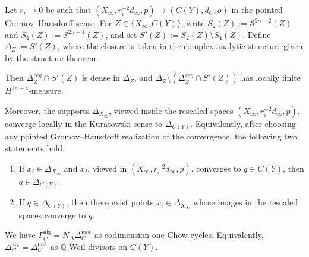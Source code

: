 \documentclass[10pt,a4paper]{amsart}
\begin{document}
\begin{lemma}
\label{lem:boundary-support-convergence}
Let $r_i\to0$ be such that
$(X_\infty,r_i^{-2}d_\infty,p)\to (C(Y),d_C,o)$ in the pointed
Gromov--Hausdorff sense. For $Z\in\{X_\infty,C(Y)\}$, write
$S_2(Z):=\mathcal S^{2n-2}(Z)$ and $S_4(Z):=\mathcal S^{2n-4}(Z)$, and set
$S'(Z):=S_2(Z)\setminus S_4(Z)$. Define
$\Delta_Z:=\overline{S'(Z)}$, where the closure is taken in the complex analytic
structure given by the structure theorem.

Then $\Delta_Z^{reg}\cap S'(Z)$ is dense in $\Delta_Z$, and
$\Delta_Z\setminus(\Delta_Z^{reg}\cap S'(Z))$ has locally finite
$H^{2n-4}$-measure.

Moreover, the supports $\Delta_{X_\infty}$, viewed inside the rescaled spaces
$(X_\infty,r_i^{-2}d_\infty,p)$, converge locally in the Kuratowski sense to
$\Delta_{C(Y)}$. Equivalently, after choosing any pointed
Gromov--Hausdorff realization of the convergence, the following two statements
hold.

\begin{enumerate}
\item If $x_i\in\Delta_{X_\infty}$ and $x_i$, viewed in
$(X_\infty,r_i^{-2}d_\infty,p)$, converges to $q\in C(Y)$, then
$q\in\Delta_{C(Y)}$.

\item If $q\in\Delta_{C(Y)}$, then there exist points
$x_i\in\Delta_{X_\infty}$ whose images in the rescaled spaces converge to $q$.
\end{enumerate}
\end{lemma}

\begin{theorem}
\label{thm:alg-met-boundary-agree}
We have $\Gamma_C^{\mathrm{alg}}=N_\Delta\Delta_C^{\mathrm{met}}$ as
codimension-one Chow cycles. Equivalently,
$\Delta_C^{\mathrm{alg}}=\Delta_C^{\mathrm{met}}$ as $\mathbb Q$-Weil divisors
on $C(Y)$.
\end{theorem}
\end{document}

